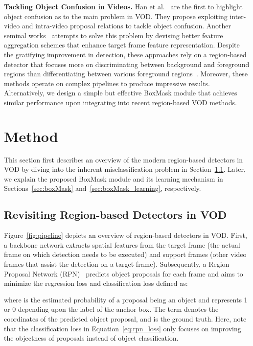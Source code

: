 \documentclass[10pt,twocolumn,letterpaper]{article}
\begin{document}
\noindent \textbf{Tackling Object Confusion in Videos.}
Han et al.~\cite{han2020mining} are the first to highlight object confusion as to the main problem in VOD. They propose exploiting inter-video and intra-video proposal relations to tackle object confusion. Another seminal works~\cite{han2020exploiting, han2021class} attempts to solve this problem by devising better feature aggregation schemes that enhance target frame feature representation. Despite the gratifying improvement in detection, these approaches rely on a region-based detector that focuses more on discriminating between background and foreground regions than differentiating between various foreground regions~\cite{cheng2018revisiting}. Moreover, these methods operate on complex pipelines to produce impressive results. Alternatively, we design a simple but effective BoxMask module that achieves similar performance upon integrating into recent region-based VOD methods.


\section{Method}
This section first describes an overview of the modern region-based detectors in VOD by diving into the inherent misclassification problem in Section~\ref{sec:region_based_vod}. Later, we explain the proposed BoxMask module and its learning mechanism in Sections~\ref{sec:boxMask} and~\ref{sec:boxMask_learning}, respectively.


\subsection{Revisiting Region-based Detectors in VOD}
\label{sec:region_based_vod}
Figure~\ref{fig:pipeline} depicts an overview of region-based detectors in VOD. First, a backbone network extracts spatial features from the target frame (the actual frame on which detection needs to be executed) and support frames (other video frames that assist the detection on a target frame). Subsequently, a Region Proposal Network (RPN)~\cite{ren2015faster} predicts object proposals for each frame and aims to minimize the regression loss  and classification loss  defined as:

where  is the estimated probability of a proposal being an object and  represents 1 or 0 depending upon the label of the anchor box. The term  denotes the coordinates of the predicted object proposal, and  is the ground truth. Here, note that the classification loss  in Equation~\ref{eq:rpn_loss} only focuses on improving the objectness of proposals instead of object classification.
\end{document}
